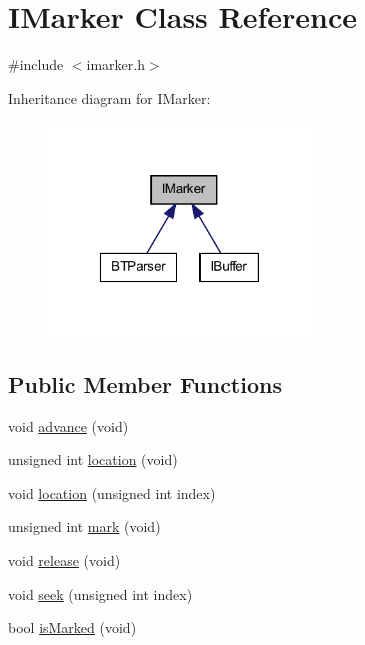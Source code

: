 \hypertarget{class_i_marker}{
\section{IMarker Class Reference}
\label{class_i_marker}
}


{\ttfamily \#include $<$imarker.h$>$}



Inheritance diagram for IMarker:\nopagebreak
\begin{figure}[H]
\begin{center}
\leavevmode
\includegraphics[width=198pt]{class_i_marker__inherit__graph}
\end{center}
\end{figure}
\subsection*{Public Member Functions}
\begin{DoxyCompactItemize}
\item 
void \hyperlink{class_i_marker_a68c539e79c3052ba7addf090dfd05985}{advance} (void)
\item 
unsigned int \hyperlink{class_i_marker_a0e9628e8c66b493ff331abab55c744da}{location} (void)
\item 
void \hyperlink{class_i_marker_ac2d7a0e8bbfb213378f7a19b50ec9686}{location} (unsigned int index)
\item 
unsigned int \hyperlink{class_i_marker_a92024922612faa5bb0106609f151c050}{mark} (void)
\item 
void \hyperlink{class_i_marker_afce4bb0bef01b4579db97e1ca5e64001}{release} (void)
\item 
void \hyperlink{class_i_marker_a58086bbf091c5b49c15464a070fec171}{seek} (unsigned int index)
\item 
bool \hyperlink{class_i_marker_ae6fda228fa071a9720e7d2309d47ac6e}{isMarked} (void)
\end{DoxyCompactItemize}
